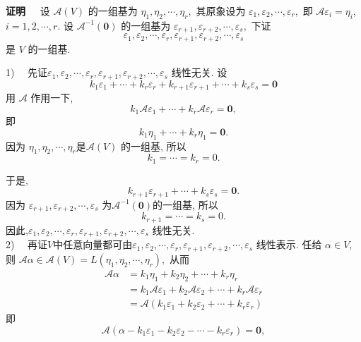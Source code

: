 \documentclass[13pt]{beamer}
\def\pf{{\bf 证明~~ }}
\def\A{\mathscr{A}}
\def\0{\mathbf{0}}
\begin{document}
\begin{frame}
\pf 设 $\A (V)$ 的一组基为 $\eta_{1}, \eta_{2}, \cdots, \eta_{r},$ 其原象设为 $\varepsilon_{1}, \varepsilon_{2}, \cdots, \varepsilon_{r},$ 即 $\A  \varepsilon_{i}=\eta_{i}$, $i=1,2, \cdots, r$.
设  $\A^{-1}(\0)$ 的一组基为 $\varepsilon_{r+1}, \varepsilon_{r+2}, \cdots, \varepsilon_{s},$ 下证$$\varepsilon_{1}, \varepsilon_{2}, \cdots, \varepsilon_{r}, \varepsilon_{r+1}, \varepsilon_{r+2}, \cdots, \varepsilon_{s}$$ 是 $V$ 的一组基.

1)~~ 先证$\varepsilon_{1}, \varepsilon_{2}, \cdots, \varepsilon_{r}, \varepsilon_{r+1}, \varepsilon_{r+2}, \cdots, \varepsilon_{s}$ 线性无关.
设$$k_{1} \varepsilon_{1}+\cdots+k_{r} \varepsilon_{r}+k_{r+1} \varepsilon_{r+1}+\cdots+k_{s} \varepsilon_{s}=\0$$
用 $\A $ 作用一下, $$k_{1} \A  \varepsilon_{1}+\cdots+k_{r} \A  \varepsilon_{r}=\0,$$ 即 $$k_{1} \eta_{1}+\cdots+k_{r} \eta_{1}=\0.$$
因为  $\eta_{1}, \eta_{2}, \cdots, \eta_{r}$是$\A (V)$ 的一组基, 所以 $$k_{1}=\cdots=k_{r}=0.$$

\end{frame}

\begin{frame}
于是,
$$k_{r+1} \varepsilon_{r+1}+\cdots+k_{s} \varepsilon_{s}=\0.$$
因为
$\varepsilon_{r+1}, \varepsilon_{r+2}, \cdots, \varepsilon_{s}$ 为$\A^{-1}(\0)$的一组基, 所以 $$k_{r+1}=\cdots=k_{s}=0.$$
因此,$\varepsilon_{1}, \varepsilon_{2}, \cdots, \varepsilon_{r}, \varepsilon_{r+1}, \varepsilon_{r+2}, \cdots, \varepsilon_{s}$ 线性无关.\\[10pt]


2)~~  再证$V$中任意向量都可由$\varepsilon_{1}, \varepsilon_{2}, \cdots, \varepsilon_{r}, \varepsilon_{r+1}, \varepsilon_{r+2}, \cdots, \varepsilon_{s}$ 线性表示.
任给 $\alpha \in V$,则 $\A  \alpha \in \A (V)=L\left(\eta_{1}, \eta_{2}, \cdots, \eta_{r}\right),$ 从而
\begin{align*}
\A  \alpha& =k_{1} \eta_{1}+k_{2} \eta_{2}+\cdots+k_{r} \eta_{r}\\
& =k_{1} \A  \varepsilon_{1}+k_{2} \A  \varepsilon_{2}+\cdots+k_{r} \A  \varepsilon_{r}\\
& =\A \left(k_{1} \varepsilon_{1}+k_{2} \varepsilon_{2}+\cdots+k_{r} \varepsilon_{r}\right)
\end{align*}
即 $$\A \left(\alpha-k_{1} \varepsilon_{1}-k_{2} \varepsilon_{2}-\cdots-k_{r} \varepsilon_{r}\right)=\0,$$ 

\end{frame}
\end{document}
